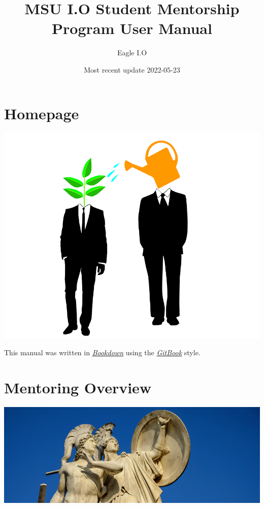 \documentclass[
  openany]{book}
\title{MSU I.O Student Mentorship Program User Manual}
\author{Eagle I.O}
\date{Most recent update 2022-05-23}
\begin{document}
\maketitle

{
\setcounter{tocdepth}{1}
\tableofcontents
}
\hypertarget{Homepage}{%
\chapter*{Homepage}\label{Homepage}}

\includegraphics{images/cover.png}

This manual was written in \href{https://bookdown.org/}{\emph{Bookdown}} using the \href{https://bookdown.org/yihui/bookdown/html.html}{\emph{GitBook}} style.

\hypertarget{mentoring-overview}{%
\chapter{Mentoring Overview}\label{mentoring-overview}}

\includegraphics{images/greek.jpg}
\end{document}

